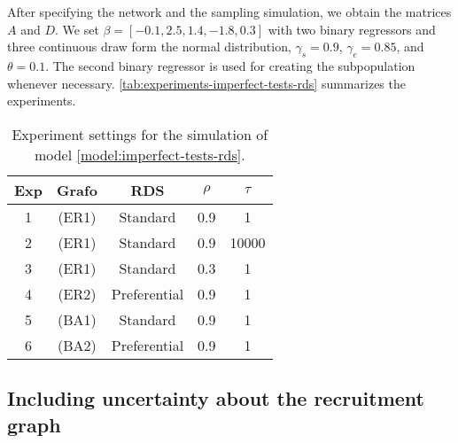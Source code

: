 After specifying the network and the sampling simulation, we obtain the
matrices $A$ and $D$. We set $\beta =
[-0.1, 2.5, 1.4, -1.8, 0.3]
$ with two binary regressors and three continuous draw form the normal
distribution, $\gamma_s = 0.9$, $\gamma_e = 0.85$, and $\theta = 0.1$. 
The second binary regressor is used for creating the subpopulation whenever
necessary. \autoref{tab:experiments-imperfect-tests-rds} summarizes the experiments. 

\begin{table}[htbp]
  \centering
  \caption{\label{tab:experiments-imperfect-tests-rds}Experiment settings for
  the simulation of model \eqref{model:imperfect-tests-rds}.}
  \begin{tabular}{ccccc}
  \hline
  Exp & Grafo & RDS & $\rho$ & $\tau$ \\ \hline
  1 & (ER1) & Standard & 0.9 & 1 \\
  2 & (ER1) & Standard & 0.9 & 10000 \\
  3 & (ER1) & Standard & 0.3 & 1 \\
  4 & (ER2) & Preferential & 0.9 & 1 \\
  5 & (BA1) & Standard & 0.9 & 1 \\
  6 & (BA2) & Preferential & 0.9 & 1 \\ \hline
  \end{tabular}
  \end{table}

\subsection{Including uncertainty about the recruitment graph}




